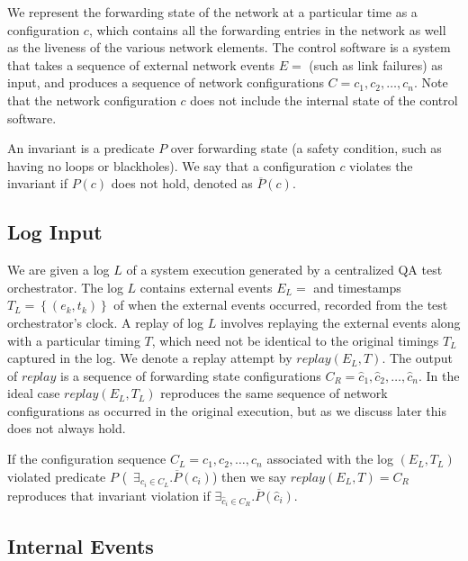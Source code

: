 We represent the forwarding state of the network
at a particular time as a configuration $c$, which contains all the forwarding
entries in the network
as well as the liveness of the various network elements.
The control software is a system %
that takes a sequence of external network events
$E = $
(such as link failures) as input,
and produces a sequence of network configurations
$C = c_1,c_2,\dots,c_n$. Note that the network configuration $c$ does not
include the internal state of the control software.

An invariant is a predicate $P$ over forwarding state (a safety
condition, such as having no loops or blackholes). We say that a configuration
$c$ violates the invariant if $P(c)$ does not
hold, denoted as $\overline{P}(c)$.

\subsection{Log Input}

We are given a log $L$ of a system execution generated
by a centralized QA test orchestrator. The log $L$ contains external
events $E_L = $
and timestamps $T_L = \left\{ (e_k, t_k) \right\}$ of when the external events
occurred, recorded from the test orchestrator's clock.
A replay of log $L$ involves replaying the external events along with a
particular timing $T$,
which need not be identical to the original timings $T_L$ captured in the
log. We
denote a replay attempt by $replay(E_L,T)$.
The output of $replay$ is a sequence of forwarding state configurations
$C_R = \hat{c}_1,\hat{c}_2,\dots,\hat{c}_n$. In the ideal case $replay(E_L,T_L)$ reproduces the same
sequence of network configurations as occurred in the original execution, but as we discuss later
this does not always hold.

If the configuration sequence $C_L = c_1,c_2,\dots,c_n$ associated with the log $(E_L, T_L)$ violated predicate $P$
(\ie~$\exists_{c_i \in C_L}. \overline{P}(c_i)$)
then we say $replay(E_L,T) = C_R$ reproduces that invariant violation if
$\exists_{\hat{c}_i \in C_R}. \overline{P}(\hat{c}_i)$.

\subsection{Internal Events}

